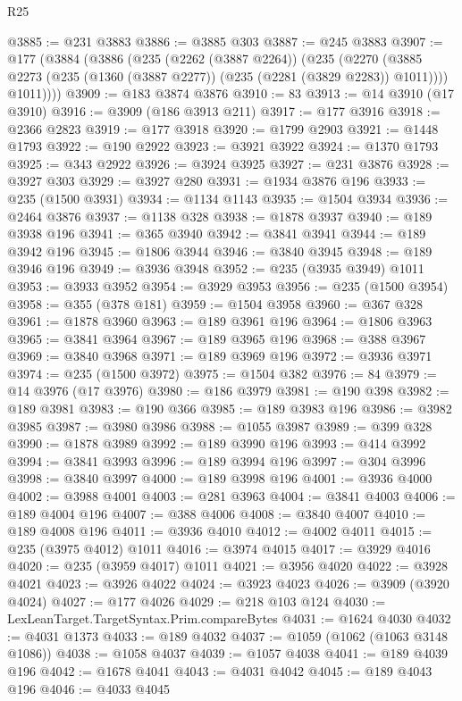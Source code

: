 \begin{lexlean}{R25}
\begin{coremodule}
@3885 := @231 @3883
@3886 := @3885 @303
@3887 := @245 @3883
@3907 := @177
    (@3884
      (@3886
        (@235
          (@2262 (@3887 @2264))
          (@235
            (@2270 (@3885 @2273 (@235 (@1360 (@3887 @2277)) (@235 (@2281 (@3829 @2283)) @1011))))
            @1011))))
@3909 := @183 @3874 @3876
@3910 := 83
@3913 := @14 @3910 (@17 @3910)
@3916 := @3909 (@186 @3913 @211)
@3917 := @177 @3916
@3918 := @2366 @2823
@3919 := @177 @3918
@3920 := @1799 @2903
@3921 := @1448 @1793
@3922 := @190 @2922
@3923 := @3921 @3922
@3924 := @1370 @1793
@3925 := @343 @2922
@3926 := @3924 @3925
@3927 := @231 @3876
@3928 := @3927 @303
@3929 := @3927 @280
@3931 := @1934 @3876 @196
@3933 := @235 (@1500 @3931)
@3934 := @1134 @1143
@3935 := @1504 @3934
@3936 := @2464 @3876
@3937 := @1138 @328
@3938 := @1878 @3937
@3940 := @189 @3938 @196
@3941 := @365 @3940
@3942 := @3841 @3941
@3944 := @189 @3942 @196
@3945 := @1806 @3944
@3946 := @3840 @3945
@3948 := @189 @3946 @196
@3949 := @3936 @3948
@3952 := @235 (@3935 @3949) @1011
@3953 := @3933 @3952
@3954 := @3929 @3953
@3956 := @235 (@1500 @3954)
@3958 := @355 (@378 @181)
@3959 := @1504 @3958
@3960 := @367 @328
@3961 := @1878 @3960
@3963 := @189 @3961 @196
@3964 := @1806 @3963
@3965 := @3841 @3964
@3967 := @189 @3965 @196
@3968 := @388 @3967
@3969 := @3840 @3968
@3971 := @189 @3969 @196
@3972 := @3936 @3971
@3974 := @235 (@1500 @3972)
@3975 := @1504 @382
@3976 := 84
@3979 := @14 @3976 (@17 @3976)
@3980 := @186 @3979
@3981 := @190 @398
@3982 := @189 @3981
@3983 := @190 @366
@3985 := @189 @3983 @196
@3986 := @3982 @3985
@3987 := @3980 @3986
@3988 := @1055 @3987
@3989 := @399 @328
@3990 := @1878 @3989
@3992 := @189 @3990 @196
@3993 := @414 @3992
@3994 := @3841 @3993
@3996 := @189 @3994 @196
@3997 := @304 @3996
@3998 := @3840 @3997
@4000 := @189 @3998 @196
@4001 := @3936 @4000
@4002 := @3988 @4001
@4003 := @281 @3963
@4004 := @3841 @4003
@4006 := @189 @4004 @196
@4007 := @388 @4006
@4008 := @3840 @4007
@4010 := @189 @4008 @196
@4011 := @3936 @4010
@4012 := @4002 @4011
@4015 := @235 (@3975 @4012) @1011
@4016 := @3974 @4015
@4017 := @3929 @4016
@4020 := @235 (@3959 @4017) @1011
@4021 := @3956 @4020
@4022 := @3928 @4021
@4023 := @3926 @4022
@4024 := @3923 @4023
@4026 := @3909 (@3920 @4024)
@4027 := @177 @4026
@4029 := @218 @103 @124
@4030 := LexLeanTarget.TargetSyntax.Prim.compareBytes
@4031 := @1624 @4030
@4032 := @4031 @1373
@4033 := @189 @4032
@4037 := @1059 (@1062 (@1063 @3148 @1086))
@4038 := @1058 @4037
@4039 := @1057 @4038
@4041 := @189 @4039 @196
@4042 := @1678 @4041
@4043 := @4031 @4042
@4045 := @189 @4043 @196
@4046 := @4033 @4045

\end{coremodule}
\end{lexlean}
